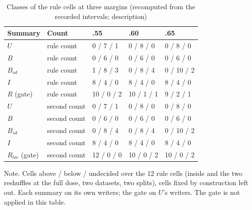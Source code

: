 \begin{table}[htbp]
\caption{Classes of the rule cells at three margins (recomputed from the recorded intervals; description)}
\label{tab:margin}
\footnotesize
\begin{tabularx}{\linewidth}{@{}llXXX@{}}
\toprule
Summary & Count & .55 & .60 & .65 \\
\midrule
$U$ & rule count & 0 / 7 / 1 & 0 / 8 / 0 & 0 / 8 / 0 \\
$B$ & rule count & 0 / 6 / 0 & 0 / 6 / 0 & 0 / 6 / 0 \\
$B_{sd}$ & rule count & 1 / 8 / 3 & 0 / 8 / 4 & 0 / 10 / 2 \\
$I$ & rule count & 8 / 4 / 0 & 8 / 4 / 0 & 8 / 4 / 0 \\
$R$ (gate) & rule count & 10 / 0 / 2 & 10 / 1 / 1 & 9 / 2 / 1 \\
$U$ & second count & 0 / 7 / 1 & 0 / 8 / 0 & 0 / 8 / 0 \\
$B$ & second count & 0 / 6 / 0 & 0 / 6 / 0 & 0 / 6 / 0 \\
$B_{sd}$ & second count & 0 / 8 / 4 & 0 / 8 / 4 & 0 / 10 / 2 \\
$I$ & second count & 8 / 4 / 0 & 8 / 4 / 0 & 8 / 4 / 0 \\
$R_{loc}$ (gate) & second count & 12 / 0 / 0 & 10 / 0 / 2 & 10 / 0 / 2 \\
\bottomrule
\end{tabularx}
\par\smallskip\footnotesize Note. Cells above / below / undecided over the 12 rule cells (inside and the two reshuffles at the full dose, two datasets, two splits), cells fixed by construction left out. Each summary on its own writers; the gate on $U$'s writers. The gate is not applied in this table.
\end{table}

